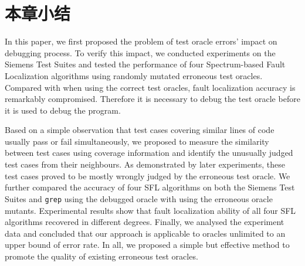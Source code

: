 \section{本章小结}

In this paper, we first proposed the problem of test oracle errors' impact on debugging process. To verify this impact, we conducted experiments on the Siemens Test Suites and tested the performance of four Spectrum-based Fault Localization algorithms using randomly mutated erroneous test oracles. Compared with when using the correct test oracles, fault localization accuracy is remarkably compromised. Therefore it is necessary to debug the test oracle before it is used to debug the program.

Based on a simple observation that test cases covering similar lines of code usually pass or fail simultaneously, we proposed to measure the similarity between test cases using coverage information and identify the unusually judged test cases from their neighbours. As demonstrated by later experiments, these test cases proved to be mostly wrongly judged by the erroneous test oracle. We further compared the accuracy of four SFL algorithms on both the Siemens Test Suites and \texttt{grep} using the debugged oracle with using the erroneous oracle mutants. Experimental results show that fault localization ability of all four SFL algorithms recovered in different degrees. Finally, we analysed the experiment data and concluded that our approach is applicable to oracles unlimited to an upper bound of error rate. In all, we proposed a simple but effective method to promote the quality of existing erroneous test oracles.

